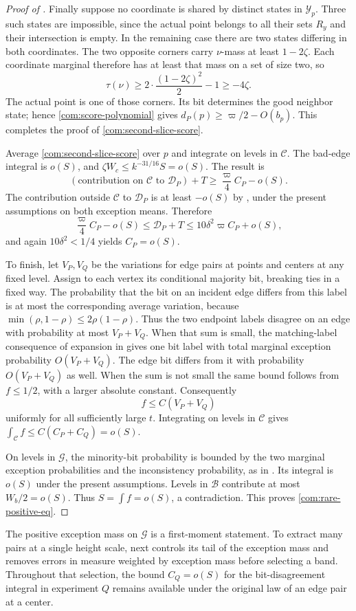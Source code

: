 \begin{proof}[Proof of ]
Finally suppose no coordinate is shared by distinct states in
\(\mathcal Y_p\). Three such states are impossible, since the actual point
belongs to all their sets \(R_y\) and their intersection is empty. In the
remaining case there are two states differing in both coordinates. The two
opposite corners carry \(\nu\)-mass at least \(1-2\zeta\). Each coordinate
marginal therefore has at least that mass on a set of size two, so
\[
 \tau(\nu)\ge
  2\cdot\frac{(1-2\zeta)^2}{2}-1\ge-4\zeta.
\]
The actual point is one of those corners. Its bit determines the good
neighbor state; hence \eqref{com:score-polynomial} gives
\(d_P(p)\ge\varpi/2-O(b_p)\). This completes the proof of
\eqref{com:second-slice-score}.

Average \eqref{com:second-slice-score} over \(p\) and integrate on levels in $\mathcal C$. The bad-edge integral is \(o(S)\), and
\(\zeta W_c\le k^{-31/16}S=o(S)\). The result is
\[
 (\text{contribution on $\mathcal C$ to }\mathcal D_P)+T
       \ge\frac\varpi4 C_P-o(S).
\]
The contribution outside $\mathcal C$ to \(\mathcal D_P\) is at least \(-o(S)\) by
, under the present assumptions on both exception
means. Therefore
\[
 \frac\varpi4 C_P-o(S)
 \le \mathcal D_P+T\le10\delta^2\varpi C_P+o(S),
\]
and again \(10\delta^2<1/4\) yields \(C_P=o(S)\).

To finish, let \(V_P,V_Q\) be the variations for edge pairs at points and centers at any fixed
level. Assign to each vertex its conditional majority bit, breaking ties
in a fixed way. The probability that the bit on an incident edge differs
from this label is at most the corresponding average variation, because
\(\min(\rho,1-\rho)\le2\rho(1-\rho)\). Thus the two endpoint labels disagree
on an edge with probability at most \(V_P+V_Q\). When that sum is small,
the matching-label consequence of expansion in  gives
one bit label with total marginal exception probability
\(O(V_P+V_Q)\). The edge bit differs from it with probability
\(O(V_P+V_Q)\) as well. When the sum is not small the same bound follows
from \(f\le1/2\), with a larger absolute constant. Consequently
\[
 f\le C(V_P+V_Q)
\]
uniformly for all sufficiently large \(t\). Integrating on levels in $\mathcal C$
gives \(\int_{\mathcal C}f\le C(C_P+C_Q)=o(S)\).

On levels in $\mathcal G$, the minority-bit probability is bounded by the two
marginal exception probabilities and the inconsistency probability, as in
. Its integral is \(o(S)\) under the present
assumptions. Levels in $\mathcal B$ contribute at most \(W_b/2=o(S)\). Thus
\(S=\int f=o(S)\), a contradiction. This proves
\eqref{com:rare-positive-eq}.
\end{proof}

The positive exception mass on $\mathcal G$ is a first-moment statement. To extract many
pairs at a single height scale,  next controls its
tail of the exception mass and removes errors in measure weighted by exception mass before
selecting a band. Throughout that selection, the bound $C_Q=o(S)$ for the bit-disagreement integral in experiment $Q$ remains available under the original law of an edge pair at a center.
